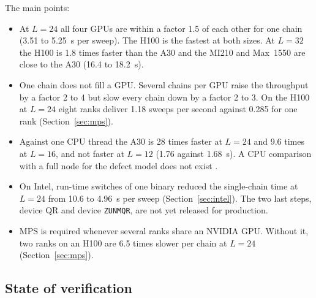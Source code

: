 The main points:
\begin{itemize}
\item At $L=24$ all four GPUs are within a factor 1.5 of each other for one chain (3.51 to 5.25~s per sweep). The H100 is the fastest at both sizes. At $L=32$ the H100 is 1.8 times faster than the A30 and the MI210 and Max~1550 are close to the A30 (16.4 to 18.2~s).
\item One chain does not fill a GPU. Several chains per GPU raise the throughput by a factor 2 to 4 but slow every chain down by a factor 2 to 3. On the H100 at $L=24$ eight ranks deliver 1.18 sweeps per second against 0.285 for one rank (Section~\ref{sec:mps}).
\item Against one CPU thread the A30 is 28 times faster at $L=24$ and 9.6 times at $L=16$, and not faster at $L=12$ (1.76 against 1.68~s). A CPU comparison with a full node for the defect model does not exist .
\item On Intel, run-time switches of one binary reduced the single-chain time at $L=24$ from 10.6 to 4.96~s per sweep (Section~\ref{sec:intel}). The two last steps, device QR and device \texttt{ZUNMQR}, are not yet released for production.
\item MPS is required whenever several ranks share an NVIDIA GPU. Without it, two ranks on an H100 are 6.5 times slower per chain at $L=24$ (Section~\ref{sec:mps}).
\end{itemize}

\subsection*{State of verification}

